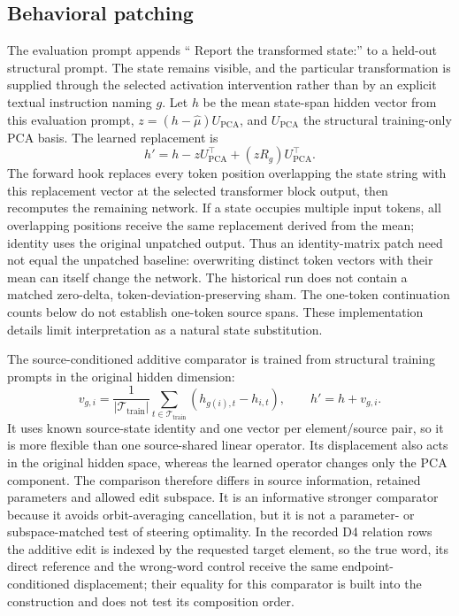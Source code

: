 \subsection{Behavioral patching}
\label{app:behavior}
The evaluation prompt appends `` Report the transformed state:'' to a held-out structural prompt. The state remains visible, and the particular transformation is supplied through the selected activation intervention rather than by an explicit textual instruction naming $g$. Let $h$ be the mean state-span hidden vector from this evaluation prompt, $z=(h-\hat{\mu})U_{\mathrm{PCA}}$, and $U_{\mathrm{PCA}}$ the structural training-only PCA basis. The learned replacement is
\[
 h'=h-zU_{\mathrm{PCA}}^\top+(zR_g)U_{\mathrm{PCA}}^\top.
\]
The forward hook replaces every token position overlapping the state string with this replacement vector at the selected transformer block output, then recomputes the remaining network. If a state occupies multiple input tokens, all overlapping positions receive the same replacement derived from the mean; identity uses the original unpatched output. Thus an identity-matrix patch need not equal the unpatched baseline: overwriting distinct token vectors with their mean can itself change the network. The historical run does not contain a matched zero-delta, token-deviation-preserving sham. The one-token continuation counts below do not establish one-token source spans. These implementation details limit interpretation as a natural state substitution.

The source-conditioned additive comparator is trained from structural training prompts in the original hidden dimension:
\[
 v_{g,i}=\frac1{|\mathcal T_{\mathrm{train}}|}\sum_{t\in\mathcal T_{\mathrm{train}}}
 (h_{g(i),t}-h_{i,t}),\qquad h'=h+v_{g,i}.
\]
It uses known source-state identity and one vector per element/source pair, so it is more flexible than one source-shared linear operator. Its displacement also acts in the original hidden space, whereas the learned operator changes only the PCA component. The comparison therefore differs in source information, retained parameters and allowed edit subspace. It is an informative stronger comparator because it avoids orbit-averaging cancellation, but it is not a parameter- or subspace-matched test of steering optimality. In the recorded D4 relation rows the additive edit is indexed by the requested target element, so the true word, its direct reference and the wrong-word control receive the same endpoint-conditioned displacement; their equality for this comparator is built into the construction and does not test its composition order.

